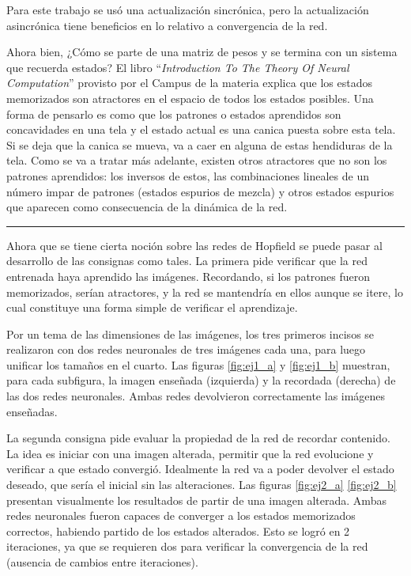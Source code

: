 \documentclass[11pt]{article} %
\begin{document}
Para este trabajo se usó una actualización sincrónica, pero la actualización asincrónica tiene beneficios en lo relativo a convergencia de la red. 

Ahora bien, ¿Cómo se parte de una matriz de pesos y se termina con un sistema que recuerda estados? El libro ``\textit{Introduction To The Theory Of Neural Computation}'' provisto por el Campus de la materia explica que los estados memorizados son atractores en el espacio de todos los estados posibles. Una forma de pensarlo es como que los patrones o estados aprendidos son concavidades en una tela y el estado actual es una canica puesta sobre esta tela. Si se deja que la canica se mueva, va a caer en alguna de estas hendiduras de la tela. Como se va a tratar más adelante, existen otros atractores que no son los patrones aprendidos: los inversos de estos, las combinaciones lineales de un número impar de patrones (estados espurios de mezcla) y otros estados espurios que aparecen como consecuencia de la dinámica de la red.

\begin{center}
\rule{0.5\linewidth}{0.5pt} %
\end{center}

Ahora que se tiene cierta noción sobre las redes de Hopfield se puede pasar al desarrollo de las consignas como tales. La primera pide verificar que la red entrenada haya aprendido las imágenes. Recordando, si los patrones fueron memorizados, serían atractores, y la red se mantendría en ellos aunque se itere, lo cual constituye una forma simple de verificar el aprendizaje. 

Por un tema de las dimensiones de las imágenes, los tres primeros incisos se realizaron con dos redes neuronales de tres imágenes cada una, para luego unificar los tamaños en el cuarto. Las figuras \ref{fig:ej1_a} y \ref{fig:ej1_b} muestran, para cada subfigura, la imagen enseñada (izquierda) y la recordada (derecha) de las dos redes neuronales. Ambas redes devolvieron correctamente las imágenes enseñadas. 

La segunda consigna pide evaluar la propiedad de la red de recordar contenido. La idea es iniciar con una imagen alterada, permitir que la red evolucione y verificar a que estado convergió. Idealmente la red va a poder devolver el estado deseado, que sería el inicial sin las alteraciones. Las figuras \ref{fig:ej2_a} \ref{fig:ej2_b} presentan visualmente los resultados de partir de una imagen alterada. Ambas redes neuronales fueron capaces de converger a los estados memorizados correctos, habiendo partido de los estados alterados. Esto se logró en 2 iteraciones, ya que se requieren dos para verificar la convergencia de la red (ausencia de cambios entre iteraciones).
\end{document}
